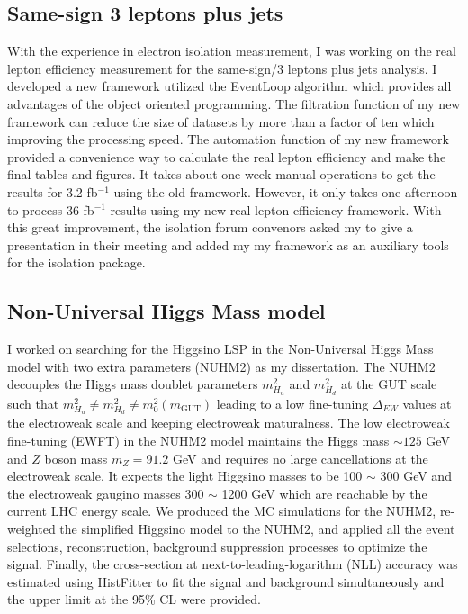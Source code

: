 \documentclass[12pt]{article}
\begin{document}
\subsection{Same-sign 3 leptons plus jets}
With the experience in electron isolation measurement, I was working on the real lepton efficiency measurement for the same-sign/3 leptons plus jets analysis.
I developed a new framework utilized the EventLoop algorithm which provides all advantages of the object oriented programming.
The filtration function of my new framework can reduce the size of datasets by more than a factor of ten which improving the processing speed.
The automation function of my new framework provided a convenience way to calculate the real lepton efficiency and make the final tables and figures.
It takes about one week manual operations to get the results for 3.2 fb$^{-1}$ using the old framework.
However, it only takes one afternoon to process 36 fb$^{-1}$ results using my new real lepton efficiency framework.
With this great improvement, the isolation forum convenors asked my to give a presentation in their meeting and added my my framework as an auxiliary tools for the isolation package.

\subsection{Non-Universal Higgs Mass model}
I worked on searching for the Higgsino LSP in the Non-Universal Higgs Mass model with two extra parameters (NUHM2) as my dissertation.
The NUHM2 decouples the Higgs mass doublet parameters $m^{2}_{H_{u}}$ and $m^{2}_{H_{d}}$ at the GUT scale such that $m^{2}_{H_{u}} \neq m^{2}_{H_{d}} \neq m^{2}_{0}(m_{\textrm{GUT}})$ leading to a low fine-tuning $\Delta_{EW}$ values at the electroweak scale and keeping electroweak maturalness.
The low electroweak fine-tuning (EWFT) in the NUHM2 model maintains the Higgs mass $\sim 125$ GeV and $Z$ boson mass $m_{Z} = 91.2$ GeV and requires no large cancellations at the electroweak scale. 
It expects the light Higgsino masses to be 100 $\sim$ 300 GeV and the electroweak gaugino masses 300 $\sim$ 1200 GeV which are reachable by the current LHC energy scale.
We produced the MC simulations for the NUHM2, re-weighted the simplified Higgsino model to the NUHM2, and applied all the event selections, reconstruction, background suppression processes to optimize the signal.
Finally, the cross-section at next-to-leading-logarithm (NLL) accuracy was estimated using HistFitter to fit the signal and background simultaneously and the upper limit at the 95\% CL were provided.
\end{document}
